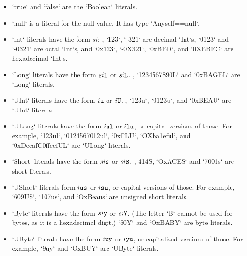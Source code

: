 \begin{itemize}

\item \xcd`true` and \xcd`false` are the \xcd`Boolean` literals. 

\item \xcd`null` is a literal for the null value.  It has type
      \xcd`Any{self==null}`.  

\item {}
\xcd`Int` literals have the form {$si$}; \eg, \xcd`123`,
      \xcd`-321` are decimal \xcd`Int`s, \xcd`0123` and \xcd`-0321` are octal
      \xcd`Int`s, and \xcd`0x123`, \xcd`-0X321`,  \xcd`0xBED`, and \xcd`0XEBEC` are
      hexadecimal \xcd`Int`s.  

\item \xcd`Long` literals have the form {$si{\tt l}$} or
      {$si{\tt L}$}. \Eg, \xcd`1234567890L`  and \xcd`0xBAGEL` are \xcd`Long` literals. 

\item \xcd`UInt` literals have the form {$i{\tt u}$} or {$i {\tt U}$}.
      \Eg, \xcd`123u`, \xcd`0123u`, and \xcd`0xBEAU` are \xcd`UInt` literals.

\item \xcd`ULong` literals have the form {$i {\tt ul}$} or {$i {\tt
      lu}$}, or capital versions of those.  For example, 
      \xcd`123ul`, \xcd`0124567012ul`,  \xcd`0xFLU`, \xcd`OXba1eful`, and \xcd`0xDecafC0ffeefUL` are \xcd`ULong`
      literals. 

\item \xcd`Short` literals have the form {$si{\tt s}$} or
      {$si{\tt S}$}. \Eg,  414S, \xcd`OxACES` and \xcd`7001s` are short
      literals. 

\item \xcd`UShort` literals  form {$i {\tt us}$} or {$i {\tt
      su}$}, or capital versions of those.  For example, \xcd`609US`, 
      \xcd`107us`, and \xcd`OxBeaus` are unsigned short literals.

\item \xcd`Byte` literals have the form  {$si{\tt y}$} or
      {$si{\tt Y}$}.  (The letter \xcd`B` cannot be used for bytes, as it is
      a hexadecimal digit.)  \xcd`50Y` and \xcd`OxBABY` are byte literals.

\item \xcd`UByte` literals have the form {$i {\tt uy}$} or {$i {\tt yu}$}, or
      capitalized versions of those.  For example, \xcd`9uy` and \xcd`OxBUY`
      are \xcd`UByte` literals.
      



\end{itemize}
